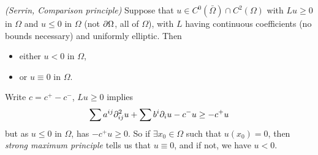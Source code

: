 \documentclass[12pt,a4paper]{article}
\newenvironment{proof}
{\begin{changemargin}{0.5cm}{0.5cm} 
	}%
	{\end{changemargin}
}
\renewenvironment{i}
{\begin{itemize} 
	}%
	{\end{itemize}
}
\newenvironment{p}
{\begin{proof} 
	}%
	{\end{proof}
}
\begin{document}
\thm \emph{(Serrin, Comparison principle)} Suppose that $u\in C^0(\bar{\Omega}) \cap C^2(\Omega)$ with $Lu \geq 0$ in $\Omega$ and $u\leq 0$ in $\Omega$ (not $\partial \Omega$, all of $\Omega$), with $L$ having continuous coefficients (no bounds necessary) and uniformly elliptic. Then
\begin{i}
\item either $u< 0$ in $\Omega$,
\item or $u\equiv 0$ in $\Omega$.
\end{i}
\begin{p}
\pf Write $c= c^+ - c^-$, $Lu \geq 0$ implies
\begin{align*}
\sum a^{ij} \partial^2_{ij} u + \sum b^i \partial_{i} u - c^- u \geq - c^+ u 
\end{align*}
but as $u\leq 0$ in $\Omega$, has $-c^+ u \geq 0$. So if $\exists x_0 \in \Omega$ such that $u(x_0)=0$, then \emph{strong maximum principle} tells us that $u\equiv 0$, and if not, we have $u < 0$.

\eop
\end{p}
\s
\end{document}
